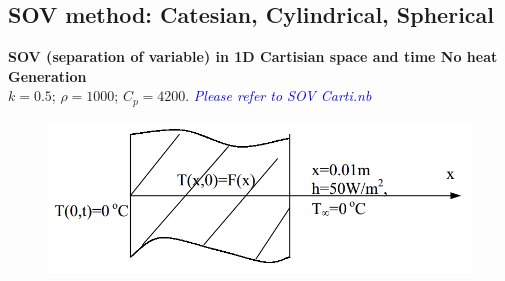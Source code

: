 \begin{appendices}
\subsection{SOV method: Catesian, Cylindrical, Spherical}
\begin{example}
\textbf{ SOV (separation of variable) in 1D Cartisian space and time
No heat Generation}\\
$k = 0.5$; $\rho=1000$; $C_p = 4200$.
\textcolor{blue} {\emph{Please refer to SOV Carti.nb}}
\begin{figure}[H]
  \centering
    \includegraphics[scale=0.5]{figures/appendixA/5}
\end{figure}


\end{example}
\end{appendices}
